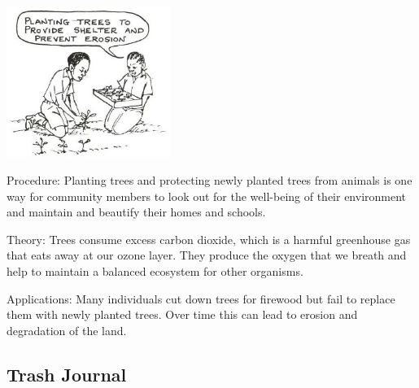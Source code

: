 \begin{multicols}{2}
\begin{center}
\includegraphics[width=0.4\textwidth]{./img/source/planting-trees.jpg}
\end{center}

\begin{description*}
\item[Procedure:]{Planting trees and protecting newly planted trees from animals is one way for community members to look out for the well-being of their environment and maintain and beautify their homes and schools.}
\item[Theory:]{Trees consume excess carbon dioxide, which is a harmful greenhouse gas that eats away at our ozone layer. They produce the oxygen that we breath and help to maintain a balanced ecosystem for other organisms. }
\item[Applications:]{Many individuals cut down trees for firewood but fail to replace them with newly planted trees. Over time this can lead to erosion and degradation of the land.}
\end{description*}

\columnbreak

\subsection{Trash Journal} %



\end{multicols}
